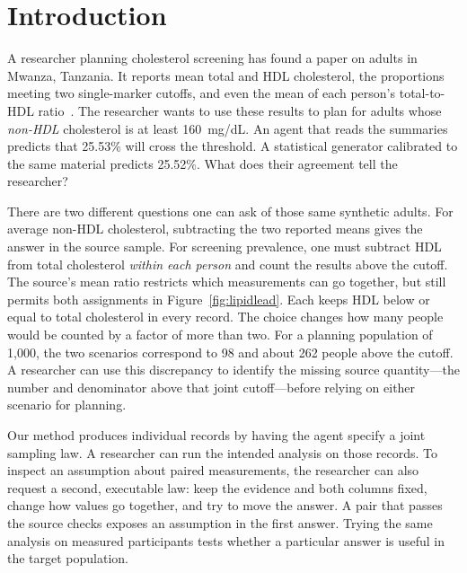 \documentclass[sigconf,anonymous,review]{acmart}
\begin{document}
\section{Introduction}
A researcher planning cholesterol screening has found a paper on adults in Mwanza, Tanzania. It reports mean total and HDL cholesterol, the proportions meeting two single-marker cutoffs, and even the mean of each person's total-to-HDL ratio~\cite{kavishe}. The researcher wants to use these results to plan for adults whose \emph{non-HDL} cholesterol is at least 160~mg/dL. An agent that reads the summaries predicts that 25.53\% will cross the threshold. A statistical generator calibrated to the same material predicts 25.52\%. What does their agreement tell the researcher?

There are two different questions one can ask of those same synthetic adults. For average non-HDL cholesterol, subtracting the two reported means gives the answer in the source sample. For screening prevalence, one must subtract HDL from total cholesterol \emph{within each person} and count the results above the cutoff. The source's mean ratio restricts which measurements can go together, but still permits both assignments in Figure~\ref{fig:lipidlead}. Each keeps HDL below or equal to total cholesterol in every record. The choice changes how many people would be counted by a factor of more than two. For a planning population of 1,000, the two scenarios correspond to 98 and about 262 people above the cutoff. A researcher can use this discrepancy to identify the missing source quantity---the number and denominator above that joint cutoff---before relying on either scenario for planning.

Our method produces individual records by having the agent specify a joint sampling law. A researcher can run the intended analysis on those records. To inspect an assumption about paired measurements, the researcher can also request a second, executable law: keep the evidence and both columns fixed, change how values go together, and try to move the answer. A pair that passes the source checks exposes an assumption in the first answer. Trying the same analysis on measured participants tests whether a particular answer is useful in the target population.
\end{document}

